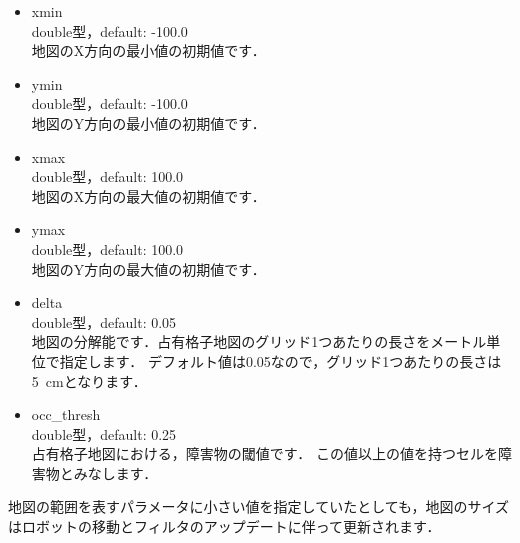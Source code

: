 \documentclass[{../../master}]{subfiles}
\begin{document}
\begin{itemize}
  \item \textsf{xmin} \\
    double型，default: -100.0 \\
    地図のX方向の最小値の初期値です．
  \item \textsf{ymin} \\
    double型，default: -100.0 \\
    地図のY方向の最小値の初期値です．
  \item \textsf{xmax} \\
    double型，default: 100.0 \\
    地図のX方向の最大値の初期値です．
  \item \textsf{ymax} \\
    double型，default: 100.0 \\
    地図のY方向の最大値の初期値です．
  \item \textsf{delta} \\
    double型，default: 0.05 \\
    地図の分解能です．占有格子地図のグリッド1つあたりの長さをメートル単位で指定します．
    デフォルト値は0.05なので，グリッド1つあたりの長さは\SI{5}{cm}となります．
  \item \textsf{occ\_thresh} \\
    double型，default: 0.25 \\
    占有格子地図における，障害物の閾値です．
    この値以上の値を持つセルを障害物とみなします．
\end{itemize}

地図の範囲を表すパラメータに小さい値を指定していたとしても，地図のサイズはロボットの移動とフィルタのアップデートに伴って更新されます．
\end{document}
